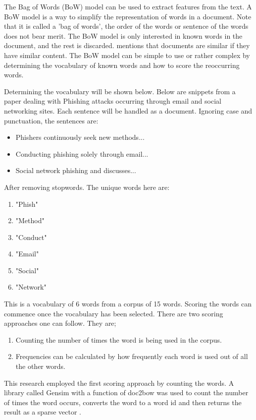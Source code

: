 The Bag of Words (BoW) model can be used to extract features from the text. A BoW model is a way to simplify the representation of words in a document. Note that it is called a 'bag of words', the order of the words or sentence of the words does not bear merit. The BoW model is only interested in known words in the document, and the rest is discarded.  mentions that documents are similar if they have similar content. The BoW model can be simple to use or rather complex by determining the vocabulary of known words and how to score the reoccurring words. 

Determining the vocabulary will be shown below.
Below are snippets from a paper dealing with Phishing attacks occurring through email and social networking sites. Each sentence will be handled as a document. Ignoring case and punctuation, the sentences are:
\begin{itemize}
    \item Phishers continuously seek new methods... 
    \item Conducting phishing solely through email...
    \item Social network phishing and discusses...
\end{itemize}
After removing stopwords. The unique words here are:
\begin{enumerate}
    \item "Phish"
    \item "Method"
    \item "Conduct"
    \item "Email"
    \item "Social"
    \item "Network"
\end{enumerate}
This is a vocabulary of 6 words from a corpus of 15 words. 
Scoring the words can commence once the vocabulary has been selected. There are two scoring approaches one can follow. They are;
\begin{enumerate}
    \item Counting the number of times the word is being used in the corpus.
    \item Frequencies can be calculated by how frequently each word is used out of all the other words.
\end{enumerate}
This research employed the first scoring approach by counting the words. A library called Gensim with a function of doc2bow was used to count the number of times the word occurs, converts the word to a word id and then returns the result as a sparse vector \cite{rehurek2010software}. 
